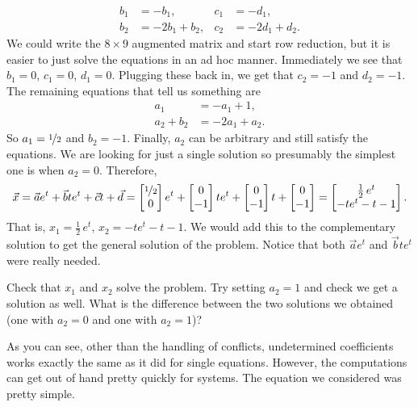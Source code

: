 \begin{example}
\begin{align*}
b_1 & = -b_1 , &
c_1 & = -d_1 , \\
b_2 & = -2b_1+b_2 , &
c_2 & = -2d_1+d_2 .
\end{align*}
We could write the $8 \times 9$ augmented matrix and start row
reduction, but it is easier to just solve the equations in an ad hoc
manner. Immediately we see that $b_1 = 0$, $c_1 = 0$, $d_1 = 0$.  Plugging
these
back in, we get that $c_2 = -1$ and $d_2 = -1$.  The remaining equations
that tell us something are
\begin{align*}
a_1 & = -a_1+1 , \\
a_2+b_2 & = -2a_1+a_2 .
\end{align*}
So $a_1 = \nicefrac{1}{2}$ and $b_2 = -1$.  Finally, $a_2$ can be arbitrary and still satisfy the
equations.  We are looking for just a single solution so presumably the
simplest
one is when $a_2 = 0$.
Therefore,
\begin{equation*}
\vec{x} = 
\vec{a}
e^{t}
+
\vec{b}
t
e^{t}
+
\vec{c}
t +
\vec{d}
=
\begin{bmatrix}
\nicefrac{1}{2} \\ 0
\end{bmatrix}
e^t
+
\begin{bmatrix}
0 \\ -1
\end{bmatrix}
te^t
+
\begin{bmatrix}
0 \\ -1
\end{bmatrix}
t
+
\begin{bmatrix}
0 \\ -1
\end{bmatrix}
=
\begin{bmatrix}
\frac{1}{2}\,e^t \\
-te^t - t - 1
\end{bmatrix} .
\end{equation*}
That is, $x_1 = \frac{1}{2}\,e^t$, $x_2 = 
-te^t - t - 1$.  We would add this to the complementary solution to get the
general solution of the problem.  Notice that both $\vec{a} e^t$
and $\vec{b} te^t$ were really needed.
\end{example}

\begin{exercise}
Check that $x_1$ and $x_2$ solve the problem.  Try setting $a_2 = 1$
and check we get a solution as well.  What is the difference between the two
solutions we obtained (one with $a_2=0$ and one with $a_2=1$)?
\end{exercise}

As you can see, other than the handling of conflicts, undetermined
coefficients works exactly the same as it did for
single equations.  However, the computations can get out of hand pretty
quickly for systems.  The equation we considered was pretty simple.

